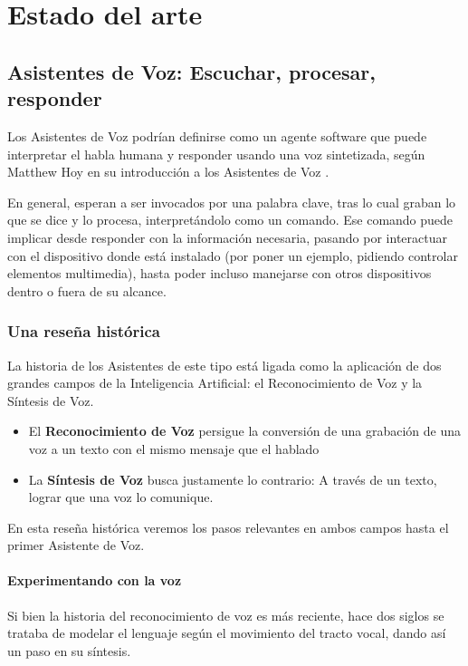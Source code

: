 \chapter{Estado del arte}

\noindent{}

\section{Asistentes de Voz: Escuchar, procesar, responder}

Los Asistentes de Voz podrían definirse como un agente software que puede interpretar el habla humana y responder usando una voz sintetizada, según Matthew Hoy en su introducción a los Asistentes de Voz \cite{vaintroduction-matthewhoy}. 

En general, esperan a ser invocados por una palabra clave, tras lo cual graban lo que se dice y lo procesa, interpretándolo como un comando. Ese comando puede implicar desde responder con la información necesaria, pasando por interactuar con el dispositivo donde está instalado (por poner un ejemplo, pidiendo controlar elementos multimedia), hasta poder incluso manejarse con otros dispositivos dentro o fuera de su alcance.

\subsection{Una reseña histórica}
La historia de los Asistentes de este tipo está ligada como la aplicación de dos grandes campos de la Inteligencia Artificial: el Reconocimiento de Voz y la Síntesis de Voz.
\begin{itemize}
	\item El \textbf{Reconocimiento de Voz} persigue la conversión de una grabación de una voz a un texto con el mismo mensaje que el hablado
	\item La \textbf{Síntesis de Voz} busca justamente lo contrario: A través de un texto, lograr que una voz lo comunique.
\end{itemize}

En esta reseña histórica veremos los pasos relevantes en ambos campos hasta el primer Asistente de Voz.

\subsubsection{Experimentando con la voz}
Si bien la historia del reconocimiento de voz es más reciente, hace dos siglos se trataba de modelar el lenguaje según el movimiento del tracto vocal, dando así un paso en su síntesis.

